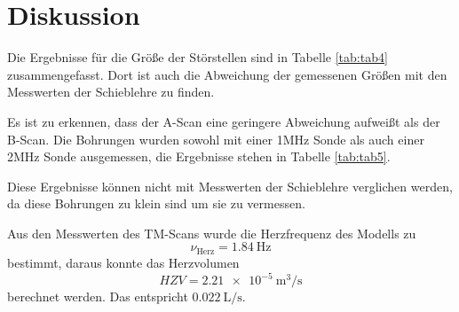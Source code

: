 \section{Diskussion}
\label{sec:Diskussion}

Die Ergebnisse für die Größe der Störstellen sind in Tabelle \ref{tab:tab4} zusammengefasst.
Dort ist auch die Abweichung der gemessenen Größen mit den Messwerten der
Schieblehre zu finden.


Es ist zu erkennen, dass der A-Scan eine geringere Abweichung aufweißt als der
B-Scan.
Die Bohrungen wurden sowohl mit einer 1\;MHz Sonde als auch einer 2\;MHz Sonde
ausgemessen, die Ergebnisse stehen in Tabelle \ref{tab:tab5}.

Diese Ergebnisse können nicht mit Messwerten der Schieblehre verglichen werden, da
diese Bohrungen zu klein sind um sie zu vermessen.

Aus den Messwerten des TM-Scans wurde die Herzfrequenz des Modells zu
\begin{equation}
  \nu_{\text{Herz}}=\SI{1,84}{\Hz}
\end{equation}
bestimmt, daraus konnte das Herzvolumen
\begin{equation}
  HZV=\SI{2,21e-5}{\m^{3}\per\s}
\end{equation}
berechnet werden. Das entspricht $\SI{0,022}{\liter\per\s}$.
